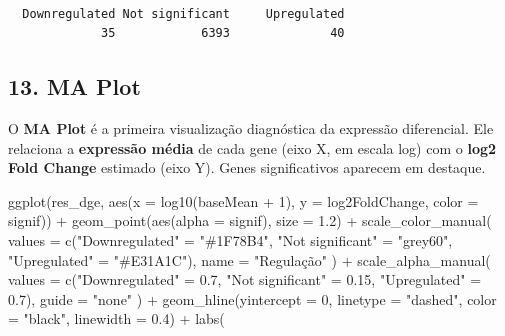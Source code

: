 \documentclass[
  letterpaper,
  DIV=11,
  numbers=noendperiod]{scrreprt}
\newenvironment{Shaded}{\begin{snugshade}}{\end{snugshade}}
\newcommand{\AttributeTok}[1]{\textcolor[rgb]{0.40,0.45,0.13}{#1}}
\newcommand{\DecValTok}[1]{\textcolor[rgb]{0.68,0.00,0.00}{#1}}
\newcommand{\FloatTok}[1]{\textcolor[rgb]{0.68,0.00,0.00}{#1}}
\newcommand{\FunctionTok}[1]{\textcolor[rgb]{0.28,0.35,0.67}{#1}}
\newcommand{\NormalTok}[1]{\textcolor[rgb]{0.00,0.23,0.31}{#1}}
\newcommand{\OtherTok}[1]{\textcolor[rgb]{0.00,0.23,0.31}{#1}}
\newcommand{\SpecialCharTok}[1]{\textcolor[rgb]{0.37,0.37,0.37}{#1}}
\newcommand{\StringTok}[1]{\textcolor[rgb]{0.13,0.47,0.30}{#1}}
\newcounter{none} %
\begin{document}
\begin{verbatim}

  Downregulated Not significant     Upregulated 
             35            6393              40 
\end{verbatim}

\subsection{13. MA Plot}\label{ma-plot}

O \textbf{MA Plot} é a primeira visualização diagnóstica da expressão
diferencial. Ele relaciona a \textbf{expressão média} de cada gene (eixo
X, em escala log) com o \textbf{log2 Fold Change} estimado (eixo Y).
Genes significativos aparecem em destaque.

\begin{Shaded}
\begin{Highlighting}[]
\FunctionTok{ggplot}\NormalTok{(res\_dge, }\FunctionTok{aes}\NormalTok{(}\AttributeTok{x =} \FunctionTok{log10}\NormalTok{(baseMean }\SpecialCharTok{+} \DecValTok{1}\NormalTok{), }\AttributeTok{y =}\NormalTok{ log2FoldChange, }\AttributeTok{color =}\NormalTok{ signif)) }\SpecialCharTok{+}
  \FunctionTok{geom\_point}\NormalTok{(}\FunctionTok{aes}\NormalTok{(}\AttributeTok{alpha =}\NormalTok{ signif), }\AttributeTok{size =} \FloatTok{1.2}\NormalTok{) }\SpecialCharTok{+}
  \FunctionTok{scale\_color\_manual}\NormalTok{(}
    \AttributeTok{values =} \FunctionTok{c}\NormalTok{(}\StringTok{"Downregulated"} \OtherTok{=} \StringTok{"\#1F78B4"}\NormalTok{,}
               \StringTok{"Not significant"} \OtherTok{=} \StringTok{"grey60"}\NormalTok{,}
               \StringTok{"Upregulated"} \OtherTok{=} \StringTok{"\#E31A1C"}\NormalTok{),}
    \AttributeTok{name =} \StringTok{"Regulação"}
\NormalTok{  ) }\SpecialCharTok{+}
  \FunctionTok{scale\_alpha\_manual}\NormalTok{(}
    \AttributeTok{values =} \FunctionTok{c}\NormalTok{(}\StringTok{"Downregulated"} \OtherTok{=} \FloatTok{0.7}\NormalTok{,}
               \StringTok{"Not significant"} \OtherTok{=} \FloatTok{0.15}\NormalTok{,}
               \StringTok{"Upregulated"} \OtherTok{=} \FloatTok{0.7}\NormalTok{),}
    \AttributeTok{guide =} \StringTok{"none"}
\NormalTok{  ) }\SpecialCharTok{+}
  \FunctionTok{geom\_hline}\NormalTok{(}\AttributeTok{yintercept =} \DecValTok{0}\NormalTok{, }\AttributeTok{linetype =} \StringTok{"dashed"}\NormalTok{, }\AttributeTok{color =} \StringTok{"black"}\NormalTok{, }\AttributeTok{linewidth =} \FloatTok{0.4}\NormalTok{) }\SpecialCharTok{+}
  \FunctionTok{labs}\NormalTok{(}

\end{Highlighting}
\end{Shaded}
\end{document}
